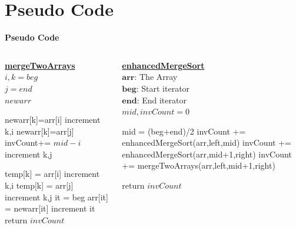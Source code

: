 \documentclass{beamer}
\begin{document}
\section{Pseudo Code}
\begin{frame}{\textbf{Pseudo Code}}
\fontsize{8pt}{8}\selectfont
\begin{columns}

\begin{column}{0.5\textwidth}
\textbf{\underline{mergeTwoArrays}}\\
\vspace{3pt}
$i,k=beg$\\
  $j=end$\\
  $newarr$
\begin{algorithmic}
        \STATE newarr[k]=arr[i]
        \STATE increment k,i
    \ELSE
        \STATE newarr[k]=arr[j]
        \STATE invCount+= $mid-i$
        \STATE increment k,j
    \ENDIF
    \ENDWHILE
    
    \STATE temp[k] = arr[i]
    \STATE increment k,i
  \ENDWHILE
    \STATE temp[k] = arr[j]
    \STATE increment k,j
  \ENDWHILE
  it = beg
    \STATE arr[it] = newarr[it]
    \STATE increment it
  \ENDWHILE
  \\return $invCount$
\end{algorithmic}
\end{column}

\begin{column}{0.5\textwidth}
\textbf{\underline{enhancedMergeSort}}\\
\vspace{3pt}
$\bm{arr}$: The Array\\
$\bm{beg}$: Start iterator\\
$\bm{end}$: End iterator\\
 $mid, invCount=0$
\begin{algorithmic}

        \STATE mid = (beg+end)/2
        \STATE invCount += enhancedMergeSort(arr,left,mid)
        \STATE invCount += enhancedMergeSort(arr,mid+1,right)
        \STATE invCount += mergeTwoArrays(arr,left,mid+1,right)
    \ENDIF
    
    return $invCount$
\end{algorithmic}
\end{column}
\end{columns}
\end{frame}
\end{document}
